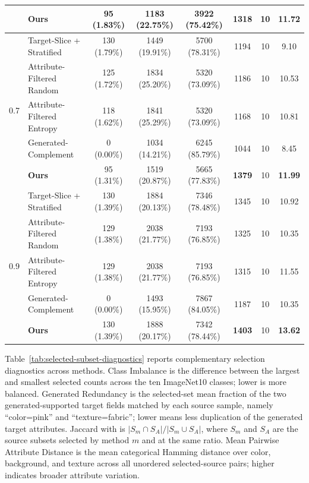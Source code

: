 \begin{table}[t]
{\begin{tabular}{c l c c c c c c}
& \textbf{Ours} & 95 (1.83\%) & 1183 (22.75\%) & 3922 (75.42\%) & \textbf{1318} & 10 & \textbf{11.72} \\
\midrule
\multirow{5}{*}{0.7}
& Target-Slice + Stratified & 130 (1.79\%) & 1449 (19.91\%) & 5700 (78.31\%) & 1194 & 10 & 9.10 \\
& Attribute-Filtered Random & 125 (1.72\%) & 1834 (25.20\%) & 5320 (73.09\%) & 1186 & 10 & 10.53 \\
& Attribute-Filtered Entropy & 118 (1.62\%) & 1841 (25.29\%) & 5320 (73.09\%) & 1168 & 10 & 10.81 \\
& Generated-Complement & 0 (0.00\%) & 1034 (14.21\%) & 6245 (85.79\%) & 1044 & 10 & 8.45 \\
& \textbf{Ours} & 95 (1.31\%) & 1519 (20.87\%) & 5665 (77.83\%) & \textbf{1379} & 10 & \textbf{11.99} \\
\midrule
\multirow{5}{*}{0.9}
& Target-Slice + Stratified & 130 (1.39\%) & 1884 (20.13\%) & 7346 (78.48\%) & 1345 & 10 & 10.92 \\
& Attribute-Filtered Random & 129 (1.38\%) & 2038 (21.77\%) & 7193 (76.85\%) & 1325 & 10 & 10.35 \\
& Attribute-Filtered Entropy & 129 (1.38\%) & 2038 (21.77\%) & 7193 (76.85\%) & 1315 & 10 & 11.55 \\
& Generated-Complement & 0 (0.00\%) & 1493 (15.95\%) & 7867 (84.05\%) & 1187 & 10 & 10.35 \\
& \textbf{Ours} & 130 (1.39\%) & 1888 (20.17\%) & 7342 (78.44\%) & \textbf{1403} & 10 & \textbf{13.62} \\
\bottomrule
\end{tabular}%
}
\end{table}

Table~\ref{tab:selected-subset-diagnostics} reports complementary selection diagnostics across methods. Class Imbalance is the difference between the largest and smallest selected counts across the ten ImageNet10 classes; lower is more balanced. Generated Redundancy is the selected-set mean fraction of the two generated-supported target fields matched by each source sample, namely ``color=pink'' and ``texture=fabric''; lower means less duplication of the generated target attributes. Jaccard with \model is $|S_m\cap S_A|/|S_m\cup S_A|$, where $S_m$ and $S_A$ are the source subsets selected by method $m$ and \model at the same ratio. Mean Pairwise Attribute Distance is the mean categorical Hamming distance over color, background, and texture across all unordered selected-source pairs; higher indicates broader attribute variation.

